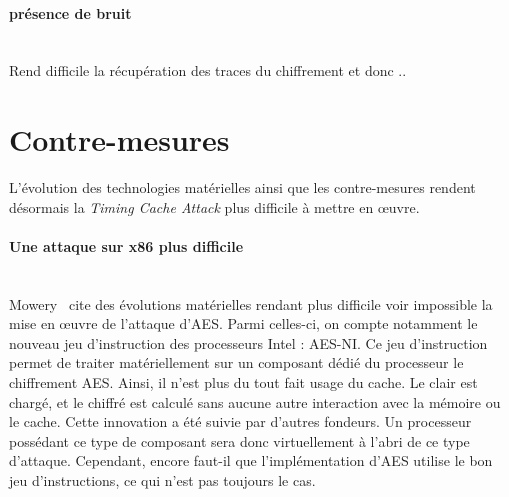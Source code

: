 \documentclass[a4paper,11pt]{article}
\begin{document}
\paragraph{présence de bruit}~\\
Rend difficile la récupération des traces du chiffrement et donc .. %

\section{Contre-mesures}

L'évolution des technologies matérielles ainsi que les contre-mesures rendent désormais la \emph{Timing Cache Attack} plus difficile à mettre en \oe uvre.

\paragraph{Une attaque sur x86 plus difficile}~\\
Mowery~\cite{mowery2012aes} cite des évolutions matérielles rendant plus difficile voir impossible la mise en œuvre de l'attaque d'AES. Parmi celles-ci, on compte notamment le nouveau jeu d'instruction des processeurs Intel : AES-NI. Ce jeu d'instruction permet de traiter matériellement sur un composant dédié du processeur le chiffrement AES. Ainsi, il n'est plus du tout fait usage du cache. Le clair est chargé, et le chiffré est calculé sans aucune autre interaction avec la mémoire ou le cache.
Cette innovation a été suivie par d'autres fondeurs. Un processeur possédant ce type de composant sera donc virtuellement à l'abri de ce type d'attaque. Cependant, encore faut-il que l'implémentation d'AES utilise le bon jeu d'instructions, ce qui n'est pas toujours le cas.
\end{document}
